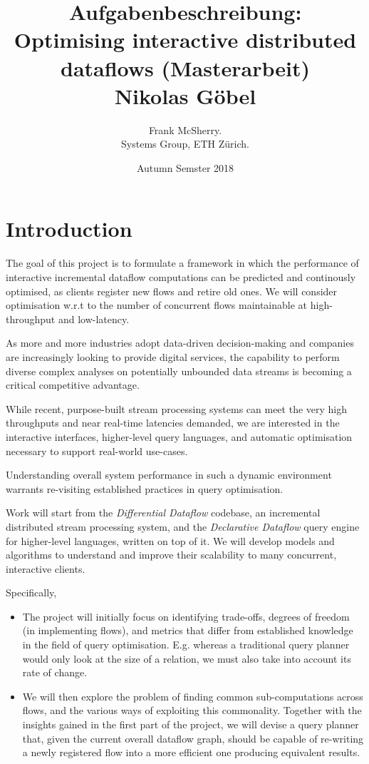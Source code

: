 \documentclass[a4paper,10pt]{article}
\date{Autumn Semster 2018}
\title{
  Aufgabenbeschreibung:\\
  Optimising interactive distributed dataflows
  (Masterarbeit)\\
  Nikolas G\"obel
}
\author{
  Frank McSherry. \\
  Systems Group, ETH Z\"urich.
}
\begin{document}
\maketitle

\section{Introduction}

The goal of this project is to formulate a framework in which the
performance of interactive incremental dataflow computations can be
predicted and continously optimised, as clients register new flows and
retire old ones. We will consider optimisation w.r.t to the number of
concurrent flows maintainable at high-throughput and low-latency.

As more and more industries adopt data-driven decision-making and
companies are increasingly looking to provide digital services, the
capability to perform diverse complex analyses on potentially
unbounded data streams is becoming a critical competitive advantage.

While recent, purpose-built stream processing systems can meet the
very high throughputs and near real-time latencies demanded, we are
interested in the interactive interfaces, higher-level query
languages, and automatic optimisation necessary to support real-world
use-cases.

Understanding overall system performance in such a dynamic environment
warrants re-visiting established practices in query optimisation.

Work will start from the \emph{Differential Dataflow} codebase, an
incremental distributed stream processing system, and the
\emph{Declarative Dataflow} query engine for higher-level languages,
written on top of it. We will develop models and algorithms to
understand and improve their scalability to many concurrent,
interactive clients.

Specifically,

\begin{itemize}

  \item The project will initially focus on identifying trade-offs,
    degrees of freedom (in implementing flows), and metrics that
    differ from established knowledge in the field of query
    optimisation. E.g. whereas a traditional query planner would only
    look at the size of a relation, we must also take into account its
    rate of change.

  \item We will then explore the problem of finding common
    sub-computations across flows, and the various ways of exploiting
    this commonality. Together with the insights gained in the first
    part of the project, we will devise a query planner that, given
    the current overall dataflow graph, should be capable of
    re-writing a newly registered flow into a more efficient one
    producing equivalent results.

\end{itemize}
\end{document}
